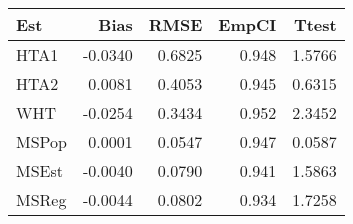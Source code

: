 
\begin{tabular}{lrrrr}
\toprule
Est & Bias & RMSE & EmpCI & Ttest\\
\midrule
HTA1 & -0.0340 & 0.6825 & 0.948 & 1.5766\\
HTA2 & 0.0081 & 0.4053 & 0.945 & 0.6315\\
WHT & -0.0254 & 0.3434 & 0.952 & 2.3452\\
MSPop & 0.0001 & 0.0547 & 0.947 & 0.0587\\
MSEst & -0.0040 & 0.0790 & 0.941 & 1.5863\\
\addlinespace
MSReg & -0.0044 & 0.0802 & 0.934 & 1.7258\\
\bottomrule
\end{tabular}